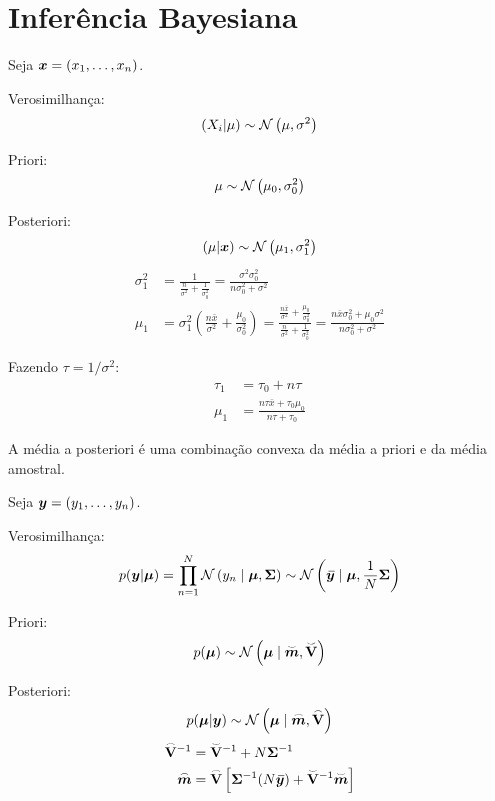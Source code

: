 
\chapter{Inferência Bayesiana}

\begin{theorem}
	\leavevmode
	Seja $\bm{x} = (x_1, \ldots, x_n)$.
	\begin{outline}[enumerate]
		\1 Verosimilhança: \\
		\[ (X_i|\mu) \sim \normdist{\mu,\sigma^2} \] 
		
		\1 Priori:
		\[ \mu \sim \normdist{\mu_0, \sigma_0^2} \]
		
		\1 Posteriori:
		\[
		(\mu | \v{x}) \sim \normdist{\mu_1, \sigma_1^2}
		\]
		\begin{align}
			\sigma_1^2 &= 	\frac{1}{\frac{n}{\sigma^2}+\frac{1}{\sigma_0^2}}= \frac{\sigma^2\sigma_0^2}{n\sigma_0^2+\sigma^2} \quad \\
			\mu_1 &= \sigma_1^2\left( \frac{n\bar{x}}{\sigma^2} + \frac{\mu_0}{\sigma_0^2}  \right) = 	\frac{\frac{n\bar{x}}{\sigma^2}+\frac{\mu_0}{\sigma_0^2}}{\frac{n}{\sigma^2}+\frac{1}{\sigma_0^2}}= \frac{n\bar{x}\sigma_0^2+\mu_0\sigma^2}{n\sigma_0^2+\sigma^2}
		\end{align}
		
		Fazendo $\tau=1/\sigma^2$:
		\begin{align}
			\tau_1 &= \tau_0 + n\tau \\
			\mu_1 &= \frac{n\tau\bar{x}+\tau_0\mu_0}{n\tau+\tau_0}
		\end{align}
		
		\begin{note}
			A média a posteriori é uma combinação convexa da média a priori e da média amostral.
		\end{note}
	\end{outline}
\end{theorem}

\begin{theorem}
	\leavevmode
	Seja $\bm{y} = (y_1, \ldots, y_n)$.
	\begin{outline}[enumerate]
		\1 Verosimilhança:
		\[ p(\v{y}|\v{\mu}) = \prod_{n=1}^{N} \normdist{y_n \mid \v{\mu}, \m{\Sigma}} \sim \normdist{\bar{\v{y}} \mid \v{\mu}, \frac{1}{N}\m{\Sigma}} \] 
		
		\1 Priori:
		\[ p(\v{\mu}) \sim \normdist{\v{\mu} \mid \prior{\v{m}}, \prior{\m{V}}} \]
		
		\1 Posteriori:
		\[
		p(\v{\mu} | \v{y}) \sim \normdist{\v{\mu} \mid \post{\v{m}}, \post{\m{V}}}
		\]
		\begin{align}
			\accentset{\frown}{\mathbf{V}}^{-1} &= \accentset{\smile}{\mathbf{V}}^{-1} + N \mathbf{\Sigma}^{-1} \\
			\accentset{\frown}{\bm{m}} &= \accentset{\frown}{\mathbf{V}} \left[ \mathbf{\Sigma}^{-1} (N\,\overline{\!{\bm{y}}}) + \accentset{\smile}{\mathbf{V}}^{-1} \accentset{\smile}{\bm{m}} \right]  
		\end{align}
	\end{outline}
\end{theorem}


